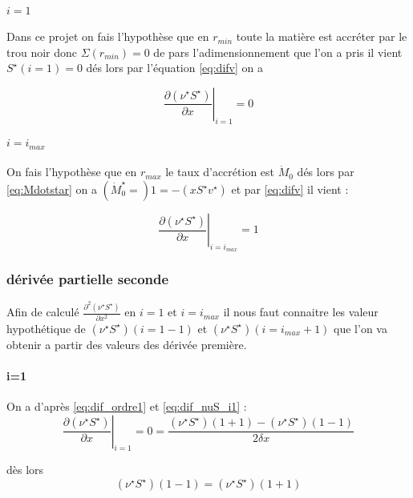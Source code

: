 \paragraph{$i=1$}
Dans ce projet on fais l'hypothèse que en $r_{min}$ toute la matière est accréter par le trou noir donc $\Sigma(r_{min})=0$ de pars l'adimensionnement que l'on a pris il vient $S^{\star}(i=1)=0$ dés lors par l'équation \eqref{eq:difv} on a

\begin{equation}
  \left. \frac{\partial (\nu^{\star} S^{\star})}{\partial x}\right|_{i=1}=0\label{eq:dif_nuS_i1}
\end{equation}

\paragraph{$i=i_{max}$}
On fais l'hypothèse que en $r_{max}$ le taux d'accrétion est $\dot{M}_0$ dés lors par \eqref{eq:Mdotstar} on a $(\dot{M}^{\star}_0=)1 = -(x S^{\star}v^{\star})$ et par \eqref{eq:difv} il vient :

\begin{equation}
  \left. \frac{\partial (\nu^{\star} S^{\star})}{\partial x}\right|_{i=i_{max}}=1\label{eq:dif_nuS_imax}
\end{equation}

\subsubsection{dérivée partielle seconde}
Afin de calculé $\frac{\partial^2(\nu^{\star} S^{\star})} {\partial x^2}$ en $i=1$ et $i=i_{max}$ il nous faut connaitre les valeur hypothétique de $(\nu^{\star} S^{\star})(i=1-1)$ et $(\nu^{\star} S^{\star})(i=i_{max}+1)$ que l'on va obtenir a partir des valeurs des dérivée première.

\paragraph{i=1}
On a d'après \eqref{eq:dif_ordre1} et \eqref{eq:dif_nuS_i1} :
\begin{equation}
  \left. \frac{\partial (\nu^{\star} S^{\star})}{\partial x}\right|_{i=1}=0=\frac{ (\nu^{\star} S^{\star})(1+1) - (\nu^{\star} S^{\star})(1-1)}{2\delta x}
\end{equation}

dès lors
\begin{equation}
  (\nu^{\star} S^{\star})(1-1)=(\nu^{\star} S^{\star})(1+1)
\end{equation}

